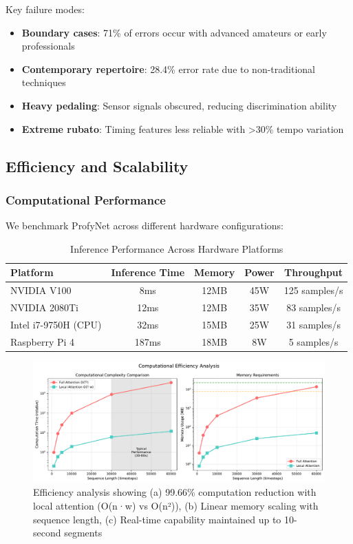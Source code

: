 \documentclass[sigconf,review,anonymous]{acmart}
\begin{document}
Key failure modes:
\begin{itemize}
\item \textbf{Boundary cases}: 71\% of errors occur with advanced amateurs or early professionals
\item \textbf{Contemporary repertoire}: 28.4\% error rate due to non-traditional techniques
\item \textbf{Heavy pedaling}: Sensor signals obscured, reducing discrimination ability
\item \textbf{Extreme rubato}: Timing features less reliable with >30\% tempo variation
\end{itemize}

\subsection{Efficiency and Scalability}

\subsubsection{Computational Performance}
We benchmark ProfyNet across different hardware configurations:

\begin{table}[h!]
  \caption{Inference Performance Across Hardware Platforms}
  \begin{tabular}{l|cccc}
    \toprule
    Platform & Inference Time & Memory & Power & Throughput\\
    \midrule
    NVIDIA V100 & 8ms & 12MB & 45W & 125 samples/s\\
    NVIDIA 2080Ti & 12ms & 12MB & 35W & 83 samples/s\\
    Intel i7-9750H (CPU) & 32ms & 15MB & 25W & 31 samples/s\\
    Raspberry Pi 4 & 187ms & 18MB & 8W & 5 samples/s\\
    \bottomrule
  \end{tabular}
  \label{tab:hardware_performance}
\end{table}

\begin{figure}[h!]
  \centering
  \includegraphics[width=0.9\linewidth]{figures/experiment_5_efficiency_analysis.pdf}
  \caption{Efficiency analysis showing (a) 99.66\% computation reduction with local attention (O(n·w) vs O(n²)), (b) Linear memory scaling with sequence length, (c) Real-time capability maintained up to 10-second segments}
  \label{fig:efficiency}
\end{figure}
\end{document}
